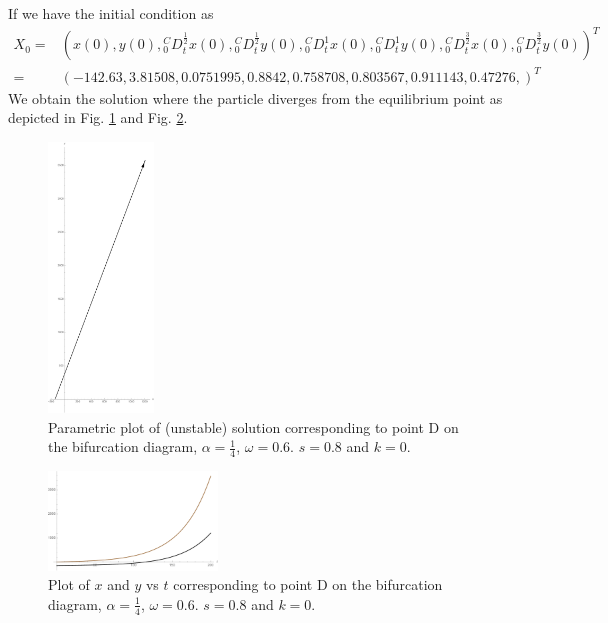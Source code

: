 \documentclass[pdflatex,sn-mathphys]{sn-jnl}%
\theoremstyle{thmstyleone}%
\theoremstyle{thmstyletwo}%
\theoremstyle{thmstylethree}%
\begin{document}
If we have the initial condition as \begin{align*}
X_{0}=&
\left(
x(0) ,
y(0) ,
{ }_{0}^{C}D_{t}^{\frac{1}{2}}x(0) ,
{ }_{0}^{C}D_{t}^{\frac{1}{2}}y(0) ,
{ }_{0}^{C}D_{t}^{1} x(0) ,
{ }_{0}^{C}D_{t}^{1}y(0) ,
{ }_{0}^{C}D_{t}^{\frac{3}{2}}x(0) ,
{ }_{0}^{C}D_{t}^{\frac{3}{2}}y(0)
\right)^T \\ =& \left(
 -142.63,
 3.81508,
 0.0751995,
 0.8842,
 0.758708,
 0.803567,
 0.911143 ,
 0.47276,
\right)^T
\end{align*}
We obtain the solution where the particle diverges from the equilibrium point as depicted in Fig. \ref{fig:Unstable parametric Point D} and Fig. \ref{fig:Unstable  Point D}.

\begin{figure}
  \centering
    \includegraphics[width=0.25\textwidth]{Fig4Left(unstable)Parametric}
    \caption{Parametric plot of (unstable) solution corresponding to point D on the bifurcation diagram, $\alpha = \frac{1}{4}$,  $\omega = 0.6$.  $s=0.8$ and $k=0$. }
    \label{fig:Unstable parametric Point D}   
\end{figure}

\begin{figure}[h]%
\centering
  \includegraphics[width=0.4\textwidth]{Fig4Left(unstable)Plot}
    \caption{Plot of $x$ and $y$ vs $t$ corresponding to point D on the bifurcation diagram, $\alpha = \frac{1}{4}$,  $\omega = 0.6$.  $s=0.8$ and $k=0$.}
    \label{fig:Unstable  Point D}
\end{figure}
\end{document}
